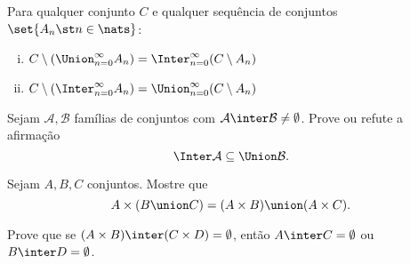 \begin{exercise}
    Para qualquer conjunto $C$ e qualquer sequência de conjuntos $\set{A_n \st n \in \nats}$:
    \begin{enumerate}[(i)]
        \item $C \setminus (\Union_{n = 0}^{\infty} A_n) = \Inter_{n = 0}^{\infty} (C \setminus A_n)$
        \item $C \setminus (\Inter_{n = 0}^{\infty} A_n) = \Union_{n = 0}^{\infty} (C \setminus A_n)$
    \end{enumerate}
\end{exercise}

\begin{exercise}
    Sejam $\mathcal{A}, \mathcal{B}$ famílias de conjuntos com $\mathcal{A} \inter \mathcal{B} \not = \emptyset$. Prove ou refute a afirmação
    $$
        \Inter \mathcal{A} \subseteq \Union \mathcal{B}.
    $$ 
\end{exercise}

\begin{exercise}
    Sejam $A,B,C$ conjuntos. Mostre que
    $$
        A \times (B \union C) = (A \times B) \union (A \times C).
    $$
\end{exercise}

\begin{exercise}
    Prove que se $(A \times B) \inter (C \times D) = \emptyset$, então $A \inter C = \emptyset$ ou $B \inter D = \emptyset$.
\end{exercise}
